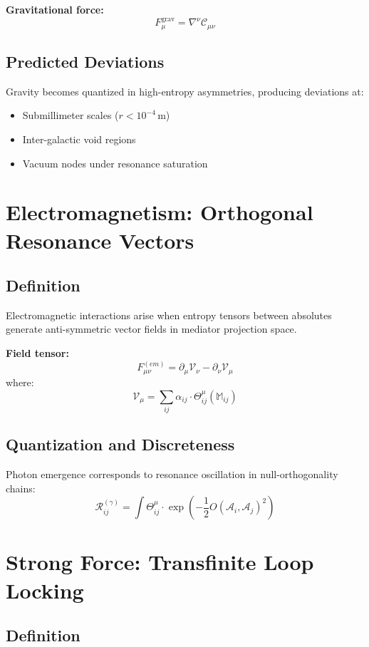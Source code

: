 \documentclass[11pt]{article}
\begin{document}
\textbf{Gravitational force:}
\[
F^\text{grav}_{\mu} = \nabla^\nu \mathscr{C}_{\mu\nu}
\]

\subsection{Predicted Deviations}

Gravity becomes quantized in high-entropy asymmetries, producing deviations at:
\begin{itemize}[noitemsep]
    \item Submillimeter scales (\(r < 10^{-4} \, \text{m}\))
    \item Inter-galactic void regions
    \item Vacuum nodes under resonance saturation
\end{itemize}

\section{Electromagnetism: Orthogonal Resonance Vectors}

\subsection{Definition}

Electromagnetic interactions arise when entropy tensors between absolutes generate anti-symmetric vector fields in mediator projection space.

\textbf{Field tensor:}
\[
F_{\mu\nu}^{(em)} = \partial_\mu \mathcal{V}_\nu - \partial_\nu \mathcal{V}_\mu
\]
where:
\[
\mathcal{V}_\mu = \sum_{ij} \alpha_{ij} \cdot \Theta_{ij}^\mu(\mathbb{M}_{ij})
\]

\subsection{Quantization and Discreteness}

Photon emergence corresponds to resonance oscillation in null-orthogonality chains:
\[
\mathscr{R}_{ij}^{(\gamma)} = \int \Theta_{ij}^\mu \cdot \exp\left(-\frac{1}{2} O(\mathcal{A}_i, \mathcal{A}_j)^2\right)
\]

\section{Strong Force: Transfinite Loop Locking}

\subsection{Definition}
\end{document}
